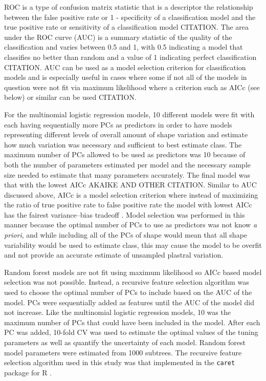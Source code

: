 \documentclass[12pt,letterpaper]{article}\usepackage{graphicx, color}
\begin{document}
ROC is a type of confusion matrix statistic that is a descriptor the relationship between the false positive rate or 1 - specificity of a classification model and the true positive rate or sensitivity of a classification model CITATION. The area under the ROC curve (AUC) is a summary statistic of the quality of the classification and varies between 0.5 and 1, with 0.5 indicating a model that classifies no better than random and a value of 1 indicating perfect classification CITATION. AUC can be used as a model selection criterion for classification models and is especially useful in cases where some if not all of the models in question were not fit via maximum likelihood where a criterion such as AICc (see below) or similar can be used CITATION.

For the multinomial logistic regression models, 10 different models were fit with each having sequentially more PCs as predictors in order to have models representing different levels of overall amount of shape variation and estimate how much variation was necessary and sufficient to best estimate class. The maximum number of PCs allowed to be used as predictors was 10 because of both the number of parameters estimated per model and the necessary sample size needed to estimate that many parameters accurately. The final model was that with the lowest AICc \citep{Burnham2002a} AKAIKE AND OTHER CITATION. Similar to AUC discussed above, AICc is a model selection criterion where instead of maximizing the ratio of true positive rate to false positive rate the model with lowest AICc has the fairest variance--bias tradeoff \citep{Burnham2002a}. Model selection was performed in this manner because the optimal number of PCs to use as predictors was not know \textit{a priori}, and while including all of the PCs of shape would mean that all shape variability would be used to estimate class, this may cause the model to be overfit and not provide an accurate estimate of unsampled plastral variation. 

Random forest models are not fit using maximum likelihood so AICc based model selection was not possible. Instead, a recursive feature selection algorithm was used to choose the optimal number of PCs to include based on the AUC of the model. PCs were sequentially added as features until the AUC of the model did not increase. Like the multinomial logistic regression models, 10 was the maximum number of PCs that could have been included in the model. After each PC was added, 10-fold CV was used to estimate the optimal values of the tuning parameters as well as quantify the uncertainty of each model. Random forest model parameters were estimated from 1000 subtrees. The recursive feature selection algorithm used in this study was that implemented in the \texttt{caret} package for R \citep{Kuhn2013}.
\end{document}
